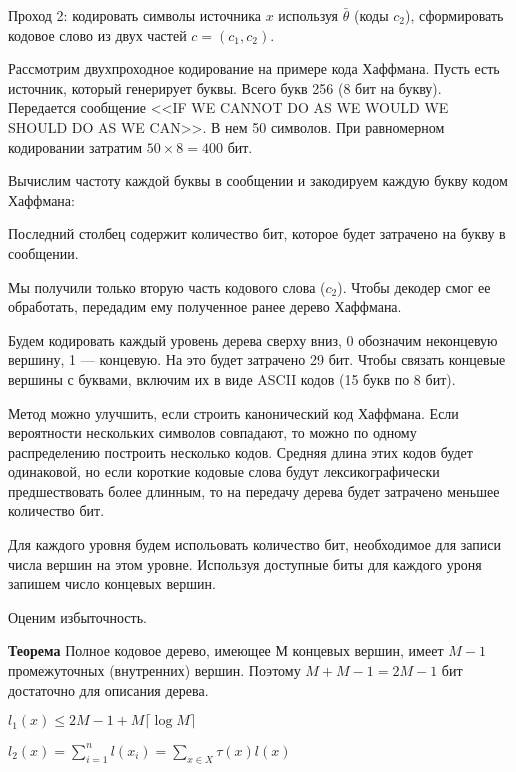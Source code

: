 {Проход 2: кодировать символы источника $x$ используя $\bar \theta$ (коды $c_2$),
сформировать кодовое слово из двух частей $c = (c_1, c_2)$.

Рассмотрим двухпроходное кодирование на примере кода Хаффмана. Пусть есть
источник, который генерирует буквы. Всего букв 256 (8 бит на букву). Передается
сообщение <<IF WE CANNOT DO AS WE WOULD WE SHOULD DO AS WE CAN>>. В нем 50
символов. При равномерном кодировании затратим $50 \times 8 = 400$ бит.

Вычислим частоту каждой буквы в сообщении и закодируем каждую букву кодом
Хаффмана:


Последний столбец содержит количество бит, которое будет затрачено на букву в
сообщении.

Мы получили только вторую часть кодового слова ($c_2$). Чтобы
декодер смог ее обработать, передадим ему полученное ранее дерево Хаффмана.


Будем кодировать каждый уровень дерева сверху вниз, 0 обозначим неконцевую
вершину, 1 --- концевую. На это будет затрачено 29 бит. Чтобы связать концевые
вершины с буквами, включим их в виде ASCII кодов (15 букв по 8 бит).

Метод можно улучшить, если строить канонический код Хаффмана. Если вероятности
нескольких символов совпадают, то можно по одному распределению построить
несколько кодов. Средняя длина этих кодов будет одинаковой, но если короткие
кодовые слова будут лексикографически предшествовать более длинным, то на
передачу дерева будет затрачено меньшее количество бит.




Для каждого уровня будем испольовать количество бит, необходимое для записи
числа вершин на этом уровне. Используя доступные биты для каждого уроня запишем
число концевых вершин.

Оценим избыточность.

\textbf{Теорема} Полное кодовое дерево, имеющее $М$ концевых вершин, имеет $M -
1$ промежуточных (внутренних) вершин. Поэтому $M + M - 1 = 2M -1$ бит достаточно для
описания дерева.

$l_1(x) \leq 2M - 1 + M \lceil \log M \rceil$

$l_2(x) = \sum_{i=1}^n l(x_i) = \sum_{x \in X} \tau(x) l(x)$

}

